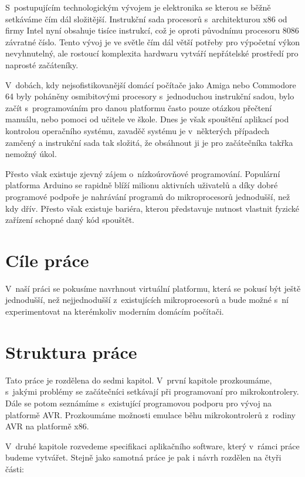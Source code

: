 \begin{introduction}

S~postupujícím technologickým vývojem je elektronika se kterou se běžně setkáváme čím dál složitější. Instrukční sada procesorů s~architekturou x86 od firmy Intel nyní obsahuje tisíce instrukcí\cite{x86-instructions}, což je oproti původnímu procesoru 8086\cite{8086-instructions} závratné číslo. Tento vývoj je ve světle čím dál větší potřeby pro výpočetní výkon nevyhnutelný, ale rostoucí komplexita hardwaru vytváří nepřátelské prostředí pro naprosté začáteníky.

V~dobách, kdy nejsofistikovanější domácí počítače jako Amiga nebo Commodore 64 byly poháněny osmibitovými procesory s~jednoduchou instrukční sadou, bylo začít s~programováním pro danou platformu často pouze otázkou přečtení manuálu, nebo pomoci od učitele ve škole. Dnes je však spouštění aplikací pod kontrolou operačního systému, zavaděč systému je v~některých případech zamčený a instrukční sada tak složitá, že obsáhnout ji je pro za\-čá\-teč\-ní\-ka takřka nemožný úkol.

Přesto však existuje zjevný zájem o~nízkoúrovňové programování. Populární platforma Arduino se rapidně blíží milionu aktivních uživatelů a díky dobré programové podpoře je nahrávání programů do mikroprocesorů jednodušší, než kdy dřív. Přesto však existuje bariéra, kterou představuje nutnost vlastnit fyzické zařízení schopné daný kód spouštět.

\section{Cíle práce}

V~naší práci se pokusíme navrhnout virtuální platformu, která se pokusí být ještě jednodušší, než nejjednodušší z~existujících mikroprocesorů a bude možné s~ní experimentovat na kterémkoliv moderním domácím počítači.

\section{Struktura práce}

Tato práce je rozdělena do sedmi kapitol. V~první kapitole prozkoumáme, s~jakými problémy se začátečníci setkávají při programovaní pro mikrokontrolery. Dále se potom seznámíme s~existující programovou podporu pro vývoj na platformě AVR. Prozkoumáme možnosti emulace běhu mikrokontrolerů z~rodiny AVR na platformě x86.

V~druhé kapitole rozvedeme specifikaci aplikačního software, který v~rámci práce budeme vytvářet. Stejně jako samotná práce je pak i návrh rozdělen na čtyři části:


\end{introduction}
